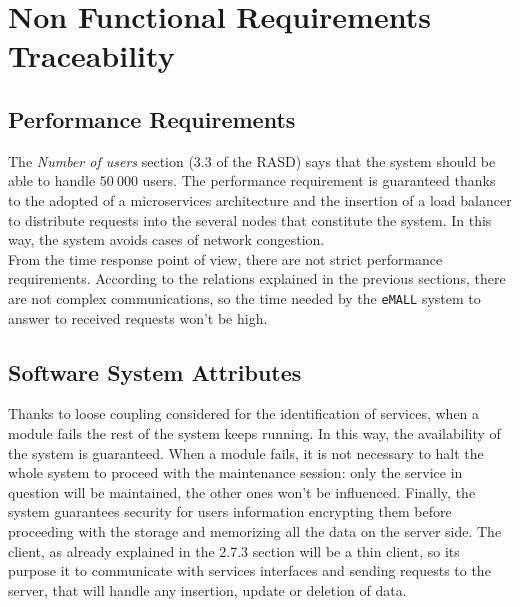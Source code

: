 \section{Non Functional Requirements Traceability}
\label{sec: non_functional_requirements_traceability}%

\subsection{Performance Requirements}
\label{subsec:performance_requirements}%
The \textit{Number of users} section (3.3 of the RASD) says that the system should be able to handle $50\ 000$ users.
The performance requirement is guaranteed thanks to the adopted of a microservices architecture and
the insertion of a load balancer to distribute requests into the several nodes that constitute the system.
In this way, the system avoids cases of network congestion. \\
From the time response point of view, there are not strict performance requirements.
According to the relations explained in the previous sections, there are not complex communications, so the time needed
by the \verb|eMALL| system to answer to received requests won't be high.

\subsection{Software System Attributes}
\label{subsec:software_system_attributes}%
Thanks to loose coupling considered for the identification of services, when a module fails the rest of the system keeps running.
In this way, the availability of the system is guaranteed.
When a module fails, it is not necessary to halt the whole system to proceed with the maintenance session:
only the service in question will be maintained, the other ones won't be influenced.
Finally, the system guarantees security for users information encrypting them before proceeding with the storage
and memorizing all the data on the server side.
The client, as already explained in the 2.7.3 section will be a thin client, so its purpose it to communicate with services
interfaces and sending requests to the server, that will handle any insertion, update or deletion of data.